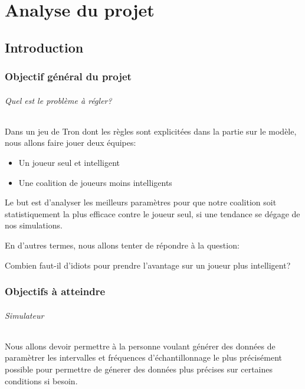 \documentclass[
	headsepline=on,
	footsepline=on,
	twoside=off,
	abstract=on,
	DIV=10
]{scrreprt}
\begin{document}
		
		
		

	\part{Analyse du projet}
		
	\chapter{Introduction}
		\section{Objectif général du projet}
		\paragraph{Quel est le problème à régler?}
		Dans un jeu de Tron dont les règles sont explicitées dans la partie sur le modèle, nous allons faire jouer deux équipes:
		
		\begin{itemize}
			\item Un joueur seul et intelligent
			\item Une coalition de joueurs moins intelligents
		\end{itemize}
		
		Le but est d'analyser les meilleurs paramètres pour que notre coalition soit statistiquement la plus efficace contre le joueur seul, si une tendance se dégage de nos simulations.
		
		En d'autres termes, nous allons tenter de répondre à la question:
		
		
		\begin{problem}
			\sffamily
			Combien faut-il d'idiots pour prendre l'avantage sur un joueur plus intelligent?
		\end{problem}
	
		\section{Objectifs à atteindre}
		\paragraph{Simulateur} 
		Nous allons devoir permettre à la personne voulant générer des données de paramètrer les intervalles et fréquences d'échantillonnage le plus précisément possible pour permettre de génerer des données plus précises sur certaines conditions si besoin.
		
\end{document}
